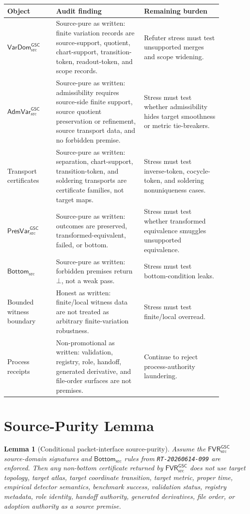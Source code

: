 \documentclass[11pt]{article}
\newcommand{\FVR}{\mathsf{FVR}_{\mathrm{src}}^{\mathsf{GSC}}}
\newcommand{\VarDom}{\mathsf{VarDom}_{\mathrm{src}}^{\mathsf{GSC}}}
\newcommand{\AdmVar}{\mathsf{AdmVar}_{\mathrm{src}}^{\mathsf{GSC}}}
\newcommand{\PresVar}{\mathsf{PresVar}_{\mathrm{src}}^{\mathsf{GSC}}}
\newcommand{\BottomSrc}{\mathsf{Bottom}_{\mathrm{src}}}
\newcommand{\Bot}{\bot}
\newtheorem{lemma}{Lemma}
\begin{document}
\begin{center}
\begin{tabular}{p{0.20\linewidth}p{0.36\linewidth}p{0.32\linewidth}}
\hline
Object & Audit finding & Remaining burden \\
\hline
\(\VarDom\) &
Source-pure as written: finite variation records are source-support,
quotient, chart-support, transition-token, readout-token, and scope records. &
Refuter stress must test unsupported merges and scope widening. \\
\(\AdmVar\) &
Source-pure as written: admissibility requires source-side finite support,
source quotient preservation or refinement, source transport data, and no
forbidden premise. &
Stress must test whether admissibility hides target smoothness or metric
tie-breakers. \\
Transport certificates &
Source-pure as written: separation, chart-support, transition-token, and
soldering transports are certificate families, not target maps. &
Stress must test inverse-token, cocycle-token, and soldering nonuniqueness
cases. \\
\(\PresVar\) &
Source-pure as written: outcomes are preserved, transformed-equivalent,
failed, or bottom. &
Stress must test whether transformed equivalence smuggles unsupported
equivalence. \\
\(\BottomSrc\) &
Source-pure as written: forbidden premises return \(\Bot\), not a weak pass. &
Stress must test bottom-condition leaks. \\
Bounded witness boundary &
Honest as written: finite/local witness data are not treated as arbitrary
finite-variation robustness. &
Stress must test finite/local overread. \\
Process receipts &
Non-promotional as written: validation, registry, role, handoff, generated
derivative, and file-order surfaces are not premises. &
Continue to reject process-authority laundering. \\
\hline
\end{tabular}
\end{center}

\section{Source-Purity Lemma}

\begin{lemma}[Conditional packet-interface source-purity]
Assume the \(\FVR\) source-domain signatures and \(\BottomSrc\) rules from
\texttt{RT-20260614-099} are enforced. Then any non-bottom certificate
returned by \(\FVR\) does not use target topology, target atlas, target
coordinate transition, target metric, proper time, empirical detector
semantics, benchmark success, validation status, registry metadata, role
identity, handoff authority, generated derivatives, file order, or adoption
authority as a source premise.
\end{lemma}
\end{document}
